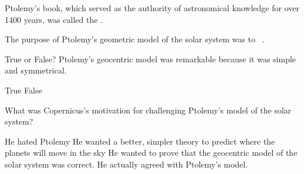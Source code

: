 \documentclass[addpoints]{exam}
\begin{document}
\begin{questions}
\question
Ptolemy's book, which served as the authority of astronomical knowledge for over 1400 years, was called the .


\question
The purpose of Ptolemy's geometric model of the solar system was to \fillin\ .


\question
True or False? Ptolemy's geocentric model was remarkable because it was simple and symmetrical.

\begin{choices}
    \choice True
    \correctchoice False
\end{choices}


\question
What was Copernicus's motivation for challenging Ptolemy's model of the solar system?

\begin{choices}
    \choice He hated Ptolemy
    \correctchoice He wanted a better, simpler theory to predict where the planets will move in the sky
    \choice He wanted to prove that the geocentric model of the solar system was correct.
    \choice He actually agreed with Ptolemy's model.
\end{choices}




\end{questions}
\end{document}
